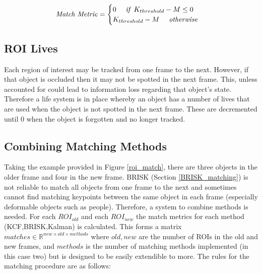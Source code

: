 \documentclass[11pt,twoside]{report}
\begin{document}
\begin{equation}
\begin{aligned}
\textnormal{\textit{Match Metric}} = 
\begin{cases}
0 \quad \textnormal{\textit{ if }} K_{threshold}-M \leq 0 \\
K_{threshold}-M \quad \textnormal{\textit{ otherwise}}
\end{cases}
\end{aligned}
\end{equation}


\subsection{ROI Lives}
Each region of interest may be tracked from one frame to the next. However, if that object is occluded then it may not be spotted in the next frame. This, unless accounted for could lead to information loss regarding that object's state. Therefore a life system is in place whereby an object has a number of lives that are used when the object is not spotted in the next frame. These are decremented until 0 when the object is forgotten and no longer tracked.  


\subsection{Combining Matching Methods} \label{matching_combining_methods}
Taking the example provided in Figure \ref{roi_match}, there are three objects in the older frame and four in the new frame. BRISK (Section \ref{BRISK_matching}) is not reliable to match all objects from one frame to the next and sometimes cannot find matching keypoints between the same object in each frame (especially deformable objects such as people). Therefore, a system to combine methods is needed. For each $ROI_{old}$ and each $ROI_{new}$ the match metrics for each method (KCF,BRISK,Kalman) is calculated. This forms a matrix $matches \in \mathbb{R}^{new \times old \times methods}$ where $old,new$ are the number of ROIs in the old and new frames, and 
$methods$ is the number of matching methods implemented (in this case two) but is designed to be easily extendible to more. The rules for the matching procedure are as follows:
\end{document}
